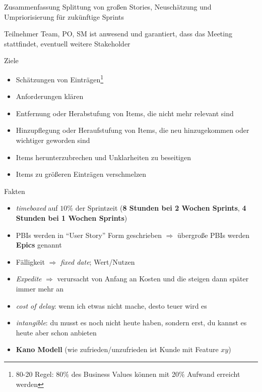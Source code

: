 \begin{Beschreibungfett}[Zusammenfassung]
  \item [Zusammenfassung] Splittung von großen Stories, Neuschätzung und Umpriorisierung für zukünftige Sprints
  \item [Teilnehmer] Team, PO, SM ist anwesend und garantiert, dass das Meeting stattfindet, eventuell weitere Stakeholder
  \item [Ziele]
    \begin{itemize}
      \item Schätzungen von Einträgen\footnote{80-20 Regel: 80$\%$ des Business Values können mit
        20$\%$ Aufwand erreicht werden}
      \item Anforderungen klären
      \item Entfernung oder Herabstufung von Items, die nicht mehr relevant sind
      \item Hinzupflegung oder Heraufstufung von Items, die neu hinzugekommen oder wichtiger geworden
        sind
      \item Items herunterzubrechen und Unklarheiten zu beseitigen
      \item Items zu größeren Einträgen verschmelzen
    \end{itemize}
  \item [Fakten]
  \begin{itemize}
    \item \textit{timeboxed} auf $10\%$ der Sprintzeit (\textbf{8 Stunden bei 2 Wochen Sprints},
      \textbf{4 Stunden bei 1 Wochen Sprints})
    \item PBIs werden in \enquote{User Story} Form geschrieben $\Rightarrow$  übergroße PBIs werden \textbf{Epics} genannt
  \end{itemize}
\end{Beschreibungfett}



\begin{itemize}
  \item Fälligkeit $\Rightarrow$ \textit{fixed date}; Wert/Nutzen
  \item \textit{Expedite} $\Rightarrow$ verursacht von Anfang an Kosten und die steigen dann später immer mehr an
  \item \textit{cost of delay}: wenn ich etwas nicht mache, desto teuer wird es
  \item \textit{intangible}: du musst es noch nicht heute haben, sondern erst, du kannst es heute aber schon anbieten
  \item \textbf{Kano Modell} (wie zufrieden/unzufrieden ist Kunde mit Feature $xy$)
\end{itemize}


